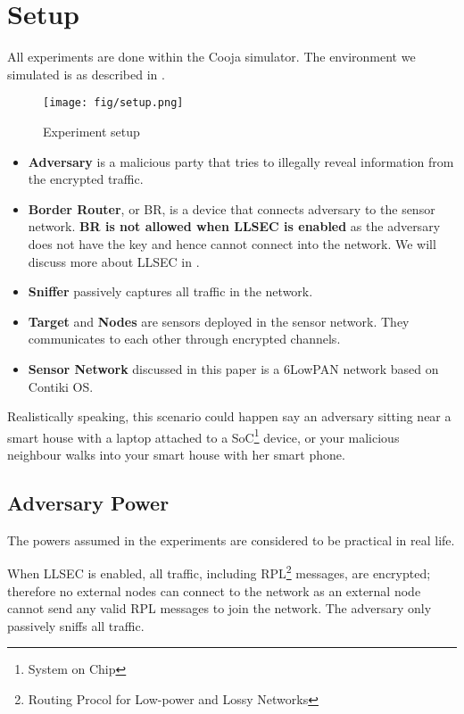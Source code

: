 \chapter{Setup} \label{Chp: Setup}
All experiments are done within the Cooja simulator. The environment we simulated is as described in .

\begin{figure*}
{
	\texttt{[image: fig/setup.png]}
}
\caption{Experiment setup} \label{fig: Setup}
\end{figure*}

\begin{itemize}
\item{\bf Adversary} is a malicious party that tries to illegally reveal information from the encrypted traffic.
\item{\bf Border Router}, or BR, is a device that connects adversary to the sensor network. \textbf{BR is not allowed when LLSEC is enabled} as the adversary does not have the key and hence cannot connect into the network. We will discuss more about LLSEC in .
\item{\bf Sniffer} passively captures all traffic in the network. 
\item{\bf Target} and {\bf Nodes} are sensors deployed in the sensor network. They communicates to each other through encrypted channels.
\item{\bf Sensor Network} discussed in this paper is a 6LowPAN network based on Contiki OS.
\end{itemize}

Realistically speaking, this scenario could happen say an adversary sitting near a smart house with a laptop attached to a SoC\footnote{System on Chip} device, or your malicious neighbour walks into your smart house with her smart phone.

\section{Adversary Power}
The powers assumed in the experiments are considered to be practical in real life.

When LLSEC is enabled, all traffic, including RPL\footnote{Routing Procol for Low-power and Lossy Networks} messages, are encrypted; therefore no external nodes can connect to the network as an external node cannot send any valid RPL messages to join the network. The adversary only passively sniffs all traffic.

